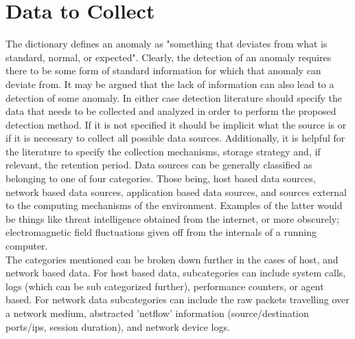 \documentclass[10pt]{IEEEtran}
\begin{document}
\section{Data to Collect}
The dictionary defines an anomaly as "something that deviates from what is standard, normal, or expected". Clearly, the detection of an anomaly requires there to be some form of standard information for which that anomaly can deviate from. It may be argued that the lack of information can also lead to a detection of some anomaly. In either case detection literature should specify the data that needs to be collected and analyzed in order to perform the proposed detection method. If it is not specified it should be implicit what the source is or if it is necessary to collect all possible data sources. Additionally, it is helpful for the literature to specify the collection mechanisms, storage strategy and, if relevant, the retention period. Data sources can be generally classified as belonging to one of four categories. Those being, host based data sources, network based data sources, application based data sources, and sources external to the computing mechanisms of the environment. Examples of the latter would be things like threat intelligence obtained from the internet, or more obscurely; electromagnetic field fluctuations given off from the internals of a running computer. \\
The categories mentioned can be broken down further in the cases of host, and network based data. For host based data, subcategories can include system calls, logs (which can be sub categorized further), performance counters, or agent based. For network data subcategories can include the raw packets travelling over a network medium, abstracted 'netflow' information (source/destination ports/ips, session duration), and network device logs. \\
\end{document}
